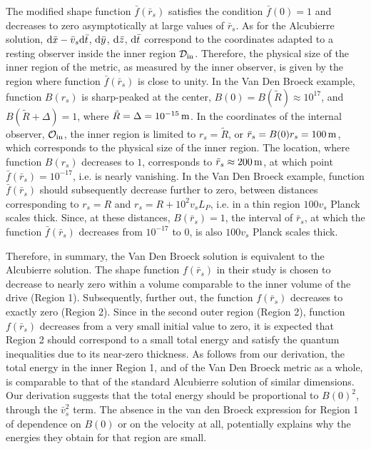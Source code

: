 \documentclass[10pt]{iopart}
\begin{document}
The modified shape function $\bar{f}(\bar{r}_s)$ satisfies the condition $\bar{f}(0)=1$ and decreases to zero asymptotically at large values of $\bar{r}_s$. As for the Alcubierre solution, ${\rm d}\bar{x}-\bar{v}_s{\rm d}\bar{t}$, ${\rm d}\bar{y}$, ${\rm d}\bar{z}$, ${\rm d} \bar{t}$ correspond to the coordinates adapted to a resting observer inside the inner region $\mathcal{D}_{\rm in}$. Therefore, the physical size of the inner region of the metric, as measured by the inner observer, is given by the region where function $\bar{f}(\bar{r}_s)$ is close to unity. In the Van Den Broeck example, function $B(r_s)$ is sharp-peaked at the center, $B(0)=B(\tilde{R})\approx 10^{17}$, and $B(\tilde{R}+\Delta)=1$, where $\tilde{R}=\Delta = 10^{-15}\,{\rm m}$. In the coordinates of the internal observer, $\mathcal{O}_{\rm in}$, the inner region is limited to $r_s=\tilde{R}$, or $\bar{r}_s=B(0) r_s= 100\,{\rm m}$, which corresponds to the physical size of the inner region. The location, where function $B(r_s)$ decreases to $1$, corresponds to $\bar{r}_s\approx 200\,{\rm m}$, at which point $\bar{f}(\bar{r}_s)=10^{-17}$, i.e. is nearly vanishing. In the Van Den Broeck example, function $\bar{f}(\bar{r}_s)$ should subsequently decrease further to zero, between distances corresponding to $r_s=R$ and $r_s=R+10^2v_sL_P$, i.e. in a thin region $100 v_s$ Planck scales thick. Since, at these distances, $B(\bar{r}_s)=1$, the interval of $\bar{r}_s$, at which the function $\bar{f}(\bar{r}_s)$ decreases from $10^{-17}$ to $0$, is also $100 v_s$ Planck scales thick.

Therefore, in summary, the Van Den Broeck solution is equivalent to the Alcubierre solution. The shape function $f(\bar{r}_s)$ in their study is chosen to decrease to nearly zero within a volume comparable to the inner volume of the drive (Region 1). Subsequently, further out, the function $f(\bar{r}_s)$ decreases to exactly zero (Region 2). Since in the second outer region (Region 2), function  $f(\bar{r}_s)$ decreases from a very small initial value to zero, it is expected that Region 2 should correspond to a small total energy and satisfy the quantum inequalities due to its near-zero thickness. As follows from our derivation, the total energy in the inner Region 1, and of the Van Den Broeck metric as a whole, is comparable to that of the standard Alcubierre solution of similar dimensions. Our derivation suggests that the total energy should be proportional to $B(0)^2$, through the $\bar{v}_s^2$ term. The absence in the van den Broeck expression for Region 1 of dependence on $B(0)$ or on the velocity at all, potentially explains why the energies they obtain for that region are small.
\end{document}

